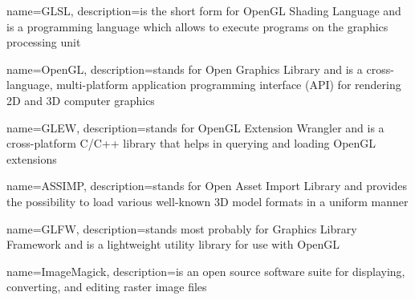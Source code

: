 {
  name=GLSL,
  description={is the short form for OpenGL Shading Language and is a programming language which allows to execute programs on the graphics processing unit}
}

{
  name=OpenGL,
  description={stands for Open Graphics Library and is a cross-language, multi-platform application programming interface (API) for rendering 2D and 3D computer graphics}
}

{
  name=GLEW,
  description={stands for OpenGL Extension Wrangler and is a cross-platform C/C++ library that helps in querying and loading OpenGL extensions}
}

{
  name=ASSIMP,
  description={stands for Open Asset Import Library and provides the possibility to load various well-known 3D model formats in a uniform manner}
}

{
  name=GLFW,
  description={stands most probably for Graphics Library Framework and is a lightweight utility library for use with OpenGL}
}

{
  name=ImageMagick,
  description={is an open source software suite for displaying, converting, and editing raster image files}
}